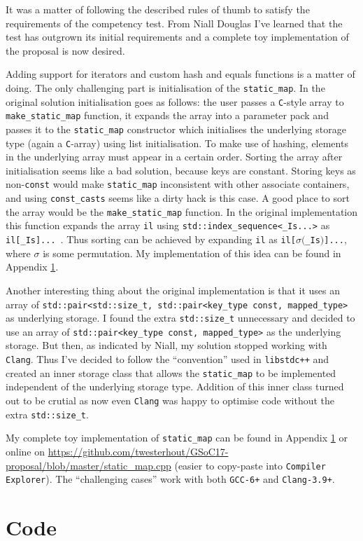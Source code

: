 \documentclass[a4paper,12pt]{article}
\begin{document}
    It was a matter of following the described rules of thumb to satisfy the requirements of the competency test. From Niall Douglas I've learned that the test has outgrown its initial requirements and a complete toy implementation of the proposal is now desired.

    Adding support for iterators and custom hash and equals functions is a matter of doing. The only challenging part is initialisation of the \texttt{static\_map}. In the original solution initialisation goes as follows: the user passes a \texttt{C}-style array to \texttt{make\_static\_map} function, it expands the array into a parameter pack and passes it to the \texttt{static\_map} constructor which initialises the underlying storage type (again a \texttt{C}-array) using list initialisation. To make use of hashing, elements in the underlying array must appear in a certain order. Sorting the array after initialisation seems like a bad solution, because keys are constant. Storing keys as non-\texttt{const} would make \texttt{static\_map} inconsistent with other associate containers, and using \texttt{const\_casts} seems like a dirty hack is this case. A good place to sort the array would be the \texttt{make\_static\_map} function. In the original implementation this function expands the array \texttt{il} using \texttt{std::index\_sequence<\_Is...>} as \texttt{il[\_Is]...}\ . Thus sorting can be achieved by expanding \texttt{il} as \texttt{il[}$\sigma($\texttt{\_Is}$)$\texttt{]...}, where $\sigma$ is some permutation. My implementation of this idea can be found in Appendix \ref{competency-code}.

    Another interesting thing about the original implementation is that it uses an array of \texttt{std::pair<std::size\_t, std::pair<key\_type const, mapped\_type>} as underlying storage. I found the extra \texttt{std::size\_t} unnecessary and decided to use an array of \texttt{std::pair<key\_type const, mapped\_type>} as the underlying storage. But then, as indicated by Niall, my solution stopped working with \texttt{Clang}. Thus I've decided to follow the ``convention'' used in \texttt{libstdc++} and created an inner storage class that allows the \texttt{static\_map} to be implemented independent of the underlying storage type. Addition of this inner class turned out to be crutial as now even \texttt{Clang} was happy to optimise code without the extra \texttt{std::size\_t}.

    My complete toy implementation of \texttt{static\_map} can be found in Appendix \ref{competency-code} or online on \url{https://github.com/twesterhout/GSoC17-proposal/blob/master/static_map.cpp} (easier to copy-paste into \texttt{Compiler Explorer}). The ``challenging cases'' work with both \texttt{GCC-6+} and \texttt{Clang-3.9+}.

\newpage
\appendix
\section{Code} \label{competency-code}
    \begin{spacing}{0.8}
    
    \end{spacing}
\end{document}
